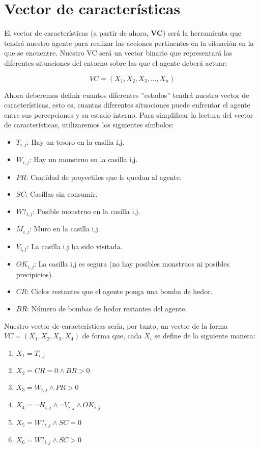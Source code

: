 \newpage
\section{Vector de características}

El vector de características (a partir de ahora, \textbf{VC}) será la herramienta que tendrá nuestro agente para realizar las acciones pertinentes en la situación en la que se encuentre. Nuestro VC será un vector binario que representará las diferentes situaciones del entorno sobre las que el agente deberá actuar:

$$ VC = (X_1,X_2,X_3, ..., X_n) $$

Ahora deberemos definir cuantos diferentes ''estados'' tendrá nuestro vector de características, esto es, cuantas diferentes situaciones puede enfrentar el agente entre sus percepciones y su estado interno. Para simplificar la lectura del vector de características, utilizaremos los siguientes símbolos:
\begin{itemize}
    \item $T_{i,j}$: Hay un tesoro en la casilla i,j.
    \item $W_{i,j}$: Hay un monstruo en la casilla i,j.
    \item $PR$: Cantidad de proyectiles que le quedan al agente.
    \item $SC$: Casillas sin consumir.
    \item $W?_{i,j}$: Posible monstruo en la casilla i,j.
    \item $M_{i,j}$: Muro en la casilla i,j.
    \item $V_{i,j}$: La casilla i,j ha sido visitada.
    \item $OK_{i,j}$: La casilla i,j es segura (no hay posibles monstruos ni posibles precipicios).
    \item $CR$: Ciclos restantes que el agente ponga una bomba de hedor.
    \item $BR$: Número de bombas de hedor restantes del agente.
\end{itemize}{}

Nuestro vector de características sería, por tanto, un vector de la forma $ VC = (X_1,X_2,X_3,X_4) $ de forma que, cada $X_i$ se define de la siguiente manera:

\begin{enumerate}
    \item $X_1 = T_{i,j}$
    \item $X_2 = CR = 0 \wedge BR > 0$
    \item $X_3 = W_{i,j} \wedge PR > 0$
    \item $X_4 = \neg H_{i,j} \wedge \neg V_{i,j} \wedge OK_{i,j}$
    \item $X_5 = W?_{i,j} \wedge SC = 0$
    \item $X_6 = W?_{i,j} \wedge SC > 0$
\end{enumerate}{}

